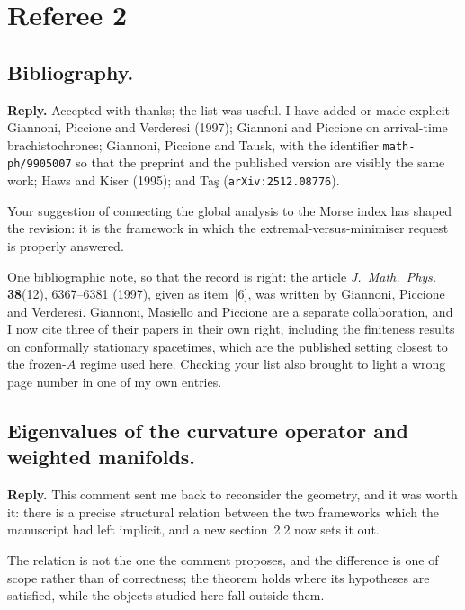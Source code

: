 \documentclass{article}
\begin{document}
\section{Referee 2}

\subsection{Bibliography.}
\textbf{Reply.} Accepted with thanks; the list was useful. I have added or made
explicit Giannoni, Piccione and Verderesi (1997); Giannoni and Piccione on
arrival-time brachistochrones; Giannoni, Piccione and Tausk, with the identifier
\texttt{math-ph/9905007} so that the preprint and the published version are visibly
the same work; Haws and Kiser (1995); and Ta\c{s} (\texttt{arXiv:2512.08776}).

Your suggestion of connecting the global analysis to the Morse index has shaped the
revision: it is the framework in which the extremal-versus-minimiser request is
properly answered.

One bibliographic note, so that the record is right: the article
\emph{J.\ Math.\ Phys.} \textbf{38}(12), 6367--6381 (1997), given as item~[6], was
written by Giannoni, Piccione and Verderesi. Giannoni, Masiello and Piccione are a
separate collaboration, and I now cite three of their papers in their own right,
including the finiteness results on conformally stationary spacetimes, which are the
published setting closest to the frozen-\(A\) regime used here. Checking your list
also brought to light a wrong page number in one of my own entries.

\subsection{Eigenvalues of the curvature operator and weighted manifolds.}
\textbf{Reply.} This comment sent me back to reconsider the geometry, and it was
worth it: there is a precise structural relation between the two frameworks which the
manuscript had left implicit, and a new section~2.2 now sets it out.

The relation is not the one the comment proposes, and the difference is one of
scope rather than of correctness; the theorem holds where its hypotheses are
satisfied, while the objects studied here fall outside them.
\end{document}
